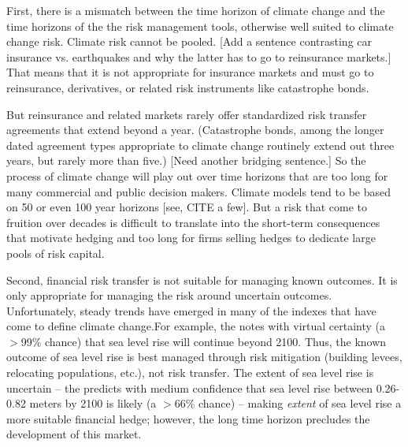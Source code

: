 \documentclass[authoryear]{article}
\begin{document}
First, there is a mismatch between the time horizon of climate change and the time horizons of the the risk management tools, otherwise well suited to climate change risk. Climate risk cannot be pooled. [Add a sentence contrasting car insurance vs. earthquakes and why the latter has to go to reinsurance markets.] That means that it is not appropriate for insurance markets and must go to reinsurance, derivatives, or related risk instruments like catastrophe bonds.

But reinsurance and related markets rarely offer standardized risk transfer agreements that extend beyond a year. (Catastrophe bonds, among the longer dated agreement types appropriate to climate change routinely extend out three years, but rarely more than five.) [Need another bridging sentence.] So the process of climate change will play out over time horizons that are too long for many commercial and public decision makers. Climate models tend to be based on 50 or even 100 year horizons [see, CITE a few]. But a risk that come to fruition over decades is difficult to translate into the short-term consequences that motivate hedging and too long for firms selling hedges to dedicate large pools of risk capital. 

Second, financial risk transfer is not suitable for managing known outcomes. It is only appropriate for managing the risk around uncertain outcomes. %
Unfortunately, steady trends have emerged in many of the indexes that have come to define climate change.For example, the \citet{ipcc2013fifthReport} notes with virtual certainty (a $>$99\% chance) that sea level rise will continue beyond 2100. Thus, the known outcome of sea level rise is best managed through risk mitigation (building levees, relocating populations, etc.), not risk transfer. The extent of sea level rise is uncertain -- the \citet{ipcc2013fifthReport} predicts with medium confidence that sea level rise between 0.26-0.82 meters by 2100 is likely (a $>$66\% chance) -- making \textit{extent} of sea level rise a more suitable financial hedge; however, the long time horizon precludes the development of this market.
\end{document}
